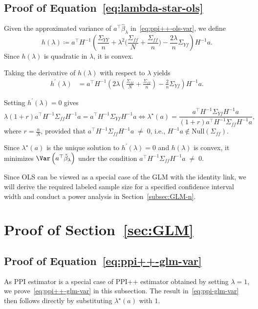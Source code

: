 \subsection{Proof of Equation~\eqref{eq:lambda-star-ols}}
Given the approximated variance of $a^\top \hat{\beta}_\lambda$ in~\eqref{eq:ppi++-ols-var}, we define\[
h(\lambda)\coloneqq a^\top H^{-1}\!\left(
\frac{\Sigma_{YY}}{n}
+\lambda^2\Big(\frac{\Sigma_{ff}}{N}+\frac{\Sigma_{ff}}{n}\Big)
-\frac{2\lambda}{n}\Sigma_{Yf}
\right)H^{-1}a.
\]
\noindent
Since $h(\lambda)$ is quadratic in $\lambda$, it is convex.

\noindent
Taking the derivative of $h(\lambda)$ with respect to $\lambda$ yields
\begin{align*}
    h^\prime(\lambda)&= a^\top H^{-1}\!\left(
2\lambda\left(\frac{\Sigma_{ff}}{N}+\frac{\Sigma_{ff}}{n}\right)
-\frac{2}{n}\Sigma_{Yf}
\right)H^{-1}a.
\end{align*}

\noindent
Setting $h^\prime(\lambda)=0$ gives \[
\lambda(1+r) a^\top H^{-1}\Sigma_{ff}H^{-1}a
=a^\top H^{-1}\Sigma_{Yf}H^{-1}a
\iff \lambda^\star(a)
=\frac{a^\top H^{-1}\Sigma_{Yf}H^{-1}a}{(1+r) a^\top H^{-1}\Sigma_{ff}H^{-1}a},
\]where $r=\frac{n}{N}$, provided that $a^\top H^{-1}\Sigma_{ff}H^{-1}a\;\neq\;0$, i.e., $H^{-1}a\notin\mathrm{Null}(\Sigma_{ff})$. 

\noindent
Since $\lambda^\star(a)$ is the unique solution to $h^\prime(\lambda)=0$ and $h(\lambda)$ is convex, it minimizes $\Var\left(a^\top\hat{\beta}_\lambda\right)$ under the condition $a^\top H^{-1}\Sigma_{ff}H^{-1}a\;\neq\;0$.

\noindent
Since OLS can be viewed as a special case of the GLM with the identity link, we will derive the required labeled sample size for a specified confidence interval width and conduct a power analysis in Section~\ref{subsec:GLM-n}.

\section{Proof of Section~\ref{sec:GLM}}

\subsection{Proof of Equation~\eqref{eq:ppi++-glm-var}}
\label{subsec:proof-var-glm}
As PPI estimator is a special case of PPI++ estimator obtained by setting $\lambda = 1$, we prove~\eqref{eq:ppi++-glm-var} in this subsection. The result in~\eqref{eq:ppi-glm-var} then follows directly by substituting $\lambda^\star(a)$ with $1$.

